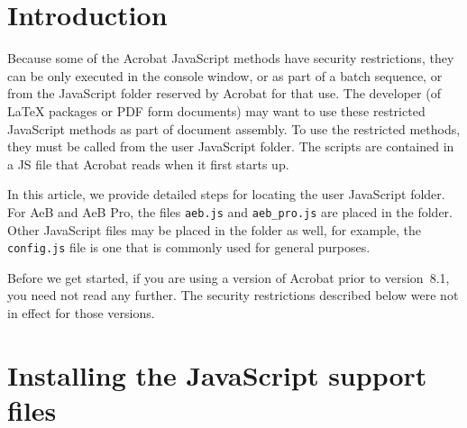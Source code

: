 \documentclass{article}
\title{\jsSupInstr}
\author{D. P. Story}
\def\AEBP{\app{AeB Pro}}
\def\AEB{\app{AeB}}
\def\app#1{\textsf{#1}}
\def\SC#1{{\small#1}}
\def\PDF{\SC{PDF}}
\begin{document}
\maketitle

\section{Introduction}

Because some of the \app{Acrobat} JavaScript methods have security
restrictions, they can be only executed in the console window, or as part
of a batch sequence, or from the JavaScript folder reserved by
\app{Acrobat} for that use. The developer (of {\LaTeX} packages or {\PDF}
form documents) may want to use these restricted JavaScript methods as
part of document assembly. To use the restricted methods, they must be
called from the user JavaScript folder. The scripts are contained in a
\SC{JS} file that \app{Acrobat} reads when it first starts up.

In this article, we provide detailed steps for locating the user
JavaScript folder. For {\AEB} and {\AEBP}, the files \texttt{aeb.js} and
\texttt{aeb\_pro.js} are placed in the folder. Other JavaScript files may
be placed in the folder as well, for example, the \texttt{config.js} file
is one that is commonly used for general purposes.

Before we get started, if you are using a version of \app{Acrobat} prior
to version~8.1, you need not read any further. The security restrictions
described below were not in effect for those versions.

\section{Installing the JavaScript support files}
\end{document}
